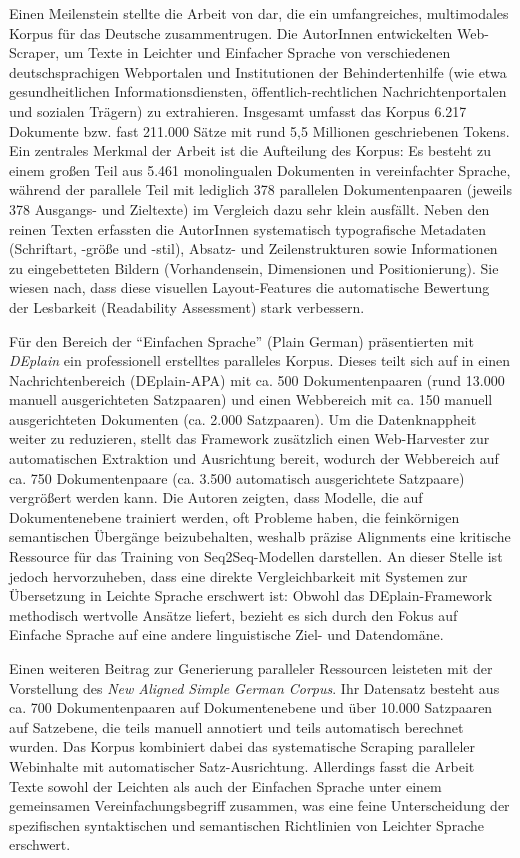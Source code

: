 Einen Meilenstein stellte die Arbeit von \citet{battisti2020corpus} dar, die ein umfangreiches, multimodales Korpus für das Deutsche zusammentrugen. Die AutorInnen entwickelten Web-Scraper, um Texte in Leichter und Einfacher Sprache von verschiedenen deutschsprachigen Webportalen und Institutionen der Behindertenhilfe (wie etwa gesundheitlichen Informationsdiensten, öffentlich-rechtlichen Nachrichtenportalen und sozialen Trägern) zu extrahieren. Insgesamt umfasst das Korpus 6.217 Dokumente bzw. fast 211.000 Sätze mit rund 5,5 Millionen geschriebenen Tokens. Ein zentrales Merkmal der Arbeit ist die Aufteilung des Korpus: Es besteht zu einem großen Teil aus 5.461 monolingualen Dokumenten in vereinfachter Sprache, während der parallele Teil mit lediglich 378 parallelen Dokumentenpaaren (jeweils 378 Ausgangs- und Zieltexte) im Vergleich dazu sehr klein ausfällt. Neben den reinen Texten erfassten die AutorInnen systematisch typografische Metadaten (Schriftart, -größe und -stil), Absatz- und Zeilenstrukturen sowie Informationen zu eingebetteten Bildern (Vorhandensein, Dimensionen und Positionierung). Sie wiesen nach, dass diese visuellen Layout-Features die automatische Bewertung der Lesbarkeit (Readability Assessment) stark verbessern. 

Für den Bereich der "`Einfachen Sprache"' (Plain German) präsentierten \citet{stodden2023deplain} mit \textit{DEplain} ein professionell erstelltes paralleles Korpus. Dieses teilt sich auf in einen Nachrichtenbereich (DEplain-APA) mit ca. 500 Dokumentenpaaren (rund 13.000 manuell ausgerichteten Satzpaaren) und einen Webbereich mit ca. 150 manuell ausgerichteten Dokumenten (ca. 2.000 Satzpaaren). Um die Datenknappheit weiter zu reduzieren, stellt das Framework zusätzlich einen Web-Harvester zur automatischen Extraktion und Ausrichtung bereit, wodurch der Webbereich auf ca. 750 Dokumentenpaare (ca. 3.500 automatisch ausgerichtete Satzpaare) vergrößert werden kann. Die Autoren zeigten, dass Modelle, die auf Dokumentenebene trainiert werden, oft Probleme haben, die feinkörnigen semantischen Übergänge beizubehalten, weshalb präzise Alignments eine kritische Ressource für das Training von Seq2Seq-Modellen darstellen. An dieser Stelle ist jedoch hervorzuheben, dass eine direkte Vergleichbarkeit mit Systemen zur Übersetzung in Leichte Sprache erschwert ist: Obwohl das DEplain-Framework methodisch wertvolle Ansätze liefert, bezieht es sich durch den Fokus auf Einfache Sprache auf eine andere linguistische Ziel- und Datendomäne.

Einen weiteren Beitrag zur Generierung paralleler Ressourcen leisteten \citet{toborek2023new} mit der Vorstellung des \textit{New Aligned Simple German Corpus}. Ihr Datensatz besteht aus ca. 700 Dokumentenpaaren auf Dokumentenebene und über 10.000 Satzpaaren auf Satzebene, die teils manuell annotiert und teils automatisch berechnet wurden. Das Korpus kombiniert dabei das systematische Scraping paralleler Webinhalte mit automatischer Satz-Ausrichtung. Allerdings fasst die Arbeit Texte sowohl der Leichten als auch der Einfachen Sprache unter einem gemeinsamen Vereinfachungsbegriff zusammen, was eine feine Unterscheidung der spezifischen syntaktischen und semantischen Richtlinien von Leichter Sprache erschwert.

